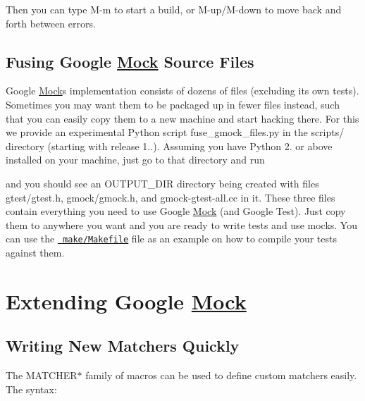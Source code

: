 Then you can type {\ttfamily M-\/m} to start a build, or {\ttfamily M-\/up}/{\ttfamily M-\/down} to move back and forth between errors.

\subsection*{Fusing Google \mbox{\hyperlink{class_mock}{Mock}} Source Files}

Google \mbox{\hyperlink{class_mock}{Mock}}\textquotesingle{}s implementation consists of dozens of files (excluding its own tests). Sometimes you may want them to be packaged up in fewer files instead, such that you can easily copy them to a new machine and start hacking there. For this we provide an experimental Python script {\ttfamily fuse\+\_\+gmock\+\_\+files.\+py} in the {\ttfamily scripts/} directory (starting with release 1..). Assuming you have Python 2. or above installed on your machine, just go to that directory and run 
\begin{DoxyCode}{0}
\end{DoxyCode}


and you should see an {\ttfamily O\+U\+T\+P\+U\+T\+\_\+\+D\+IR} directory being created with files {\ttfamily gtest/gtest.\+h}, {\ttfamily gmock/gmock.\+h}, and {\ttfamily gmock-\/gtest-\/all.\+cc} in it. These three files contain everything you need to use Google \mbox{\hyperlink{class_mock}{Mock}} (and Google Test). Just copy them to anywhere you want and you are ready to write tests and use mocks. You can use the \href{../make/Makefile}{\texttt{ make/\+Makefile}} file as an example on how to compile your tests against them.

\section*{Extending Google \mbox{\hyperlink{class_mock}{Mock}}}

\subsection*{Writing New Matchers Quickly}

The {\ttfamily M\+A\+T\+C\+H\+E\+R$\ast$} family of macros can be used to define custom matchers easily. The syntax\+:


\begin{DoxyCode}{0}
\end{DoxyCode}


